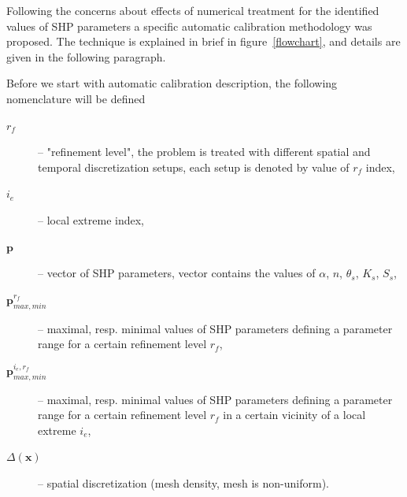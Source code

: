 \documentclass[review,times,3p,twocolumn,10pt]{elsarticle}
\renewcommand{\vec}{\mathbf}
\begin{document}
Following the concerns about  effects of numerical treatment for the identified values of SHP parameters a specific  automatic calibration methodology was proposed. The technique is explained in brief in figure~\ref{flowchart}, and  details are given in the following paragraph.

Before we start with automatic calibration description, the following nomenclature will  be defined %

\hrulefill
\begin{description}
\item[$r_f$] -- "refinement level", the problem is treated with different spatial and temporal discretization setups, each setup is denoted by value of $r_f$ index,
\item[$i_e$] -- local extreme index,
\item[$\vec{p}$] -- vector of SHP parameters, vector contains the values of $\alpha$, $n$, $\theta_s$, $K_s$, $S_s$,
\item[$\vec{p}_{max,min}^{r_f}$] -- maximal, resp. minimal values of SHP parameters defining a parameter range for a certain refinement level $r_f$,
\item[$\vec{p}_{max,min}^{ i_e, r_f}$] -- maximal, resp. minimal values of SHP parameters defining a parameter range for a certain refinement level $r_f$ in a certain vicinity of a local extreme $i_e$,
\item[$\Delta(\vec{x})$] -- spatial discretization (mesh density, mesh is non-uniform).
\end{description}
\hrulefill
\end{document}
